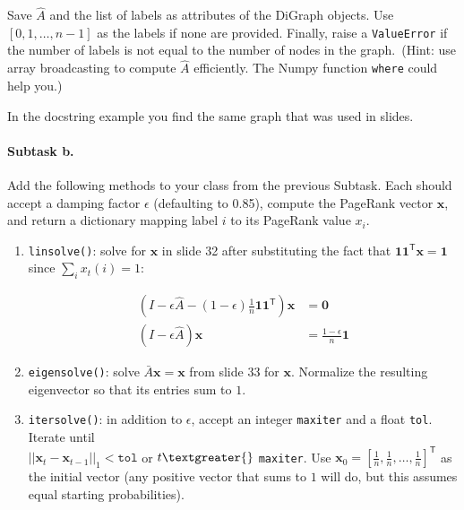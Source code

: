 \documentclass[a4paper,10pt]{article}
\begin{document}
Save \(\widehat{A}\) and the list of labels as attributes of the DiGraph
objects. Use
\([0,1,\ldots,n-1]\) as the labels if none are provided. Finally, raise
a \texttt{ValueError} if the number of labels is not equal to the number
of nodes in the graph.~(Hint: use array broadcasting to compute
\(\widehat{A}\) efficiently. The Numpy function \texttt{where} could
help you.)

In the docstring example you find the same graph that was used in
slides.

\paragraph{Subtask b.}\label{subtask-b.}

Add the following methods to your class from the previous Subtask. Each
should accept a damping factor \(\epsilon\) (defaulting to 0.85),
compute the PageRank vector \(\mathbf{x}\), and return a dictionary
mapping label \(i\) to its PageRank value \(x_i\).

\begin{enumerate}
\def\labelenumi{\arabic{enumi}.}
\item
  \texttt{linsolve()}: solve for \(\mathbf{x}\) in slide 32 after
  substituting the fact that
  \(\mathbf{1}\mathbf{1}^{\mathsf{T}}\mathbf{x}=\mathbf{1}\) since
  \(\sum_i x_t(i)=1\):

  \[
      \begin{array}{rl}
      \left(I -\epsilon\widehat{A}-(1-\epsilon)\frac{1}{n}\mathbf{1}\mathbf{1}^{\mathsf{T}}\right)\mathbf{x}&=\mathbf{0}\\
      \left(I - \epsilon\widehat{A}\right)\mathbf{x}&=\frac{1-\epsilon}{n}\mathbf{1}
      \end{array}
  \]
\item
  \texttt{eigensolve()}: solve \(\bar{A}\mathbf{x} = \mathbf{x}\) from
  slide 33 for \(\mathbf{x}\). Normalize the resulting eigenvector so that
  its entries sum to \(1\).
\item
  \texttt{itersolve()}: in addition to \(\epsilon\), accept an
  integer \texttt{maxiter} and a float \texttt{tol}. Iterate until\\
  $||\mathbf{x}_t - \mathbf{x}_{t-1}||_1 < \texttt{tol}$ or
  $t \textgreater{} $ \texttt{maxiter}.
  Use \(\mathbf{x}_{0}=[\frac{1}{n},\frac{1}{n},\ldots,\frac{1}{n}]^{\mathsf{T}}\)
  as the initial vector (any positive vector that sums to \(1\) will do,
  but this assumes equal starting probabilities).
\end{enumerate}
\end{document}
